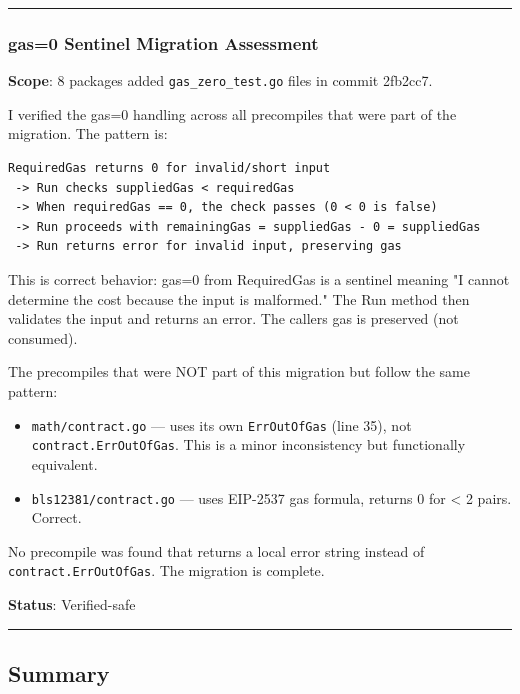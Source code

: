 \documentclass[
]{article}
\providecommand{\tightlist}{%
  \setlength{\itemsep}{0pt}\setlength{\parskip}{0pt}}
\begin{document}
\begin{center}\rule{0.5\linewidth}{0.5pt}\end{center}

\subsubsection{gas=0 Sentinel Migration
Assessment}\label{gas0-sentinel-migration-assessment}

\textbf{Scope}: 8 packages added \texttt{gas\_zero\_test.go} files in
commit 2fb2cc7.

I verified the gas=0 handling across all precompiles that were part of
the migration. The pattern is:

\begin{verbatim}
RequiredGas returns 0 for invalid/short input
 -> Run checks suppliedGas < requiredGas
 -> When requiredGas == 0, the check passes (0 < 0 is false)
 -> Run proceeds with remainingGas = suppliedGas - 0 = suppliedGas
 -> Run returns error for invalid input, preserving gas
\end{verbatim}

This is correct behavior: gas=0 from RequiredGas is a sentinel meaning
"I cannot determine the cost because the input is malformed." The Run
method then validates the input and returns an error. The
caller\textquotesingle s gas is preserved (not consumed).

The precompiles that were NOT part of this migration but follow the same
pattern:

\begin{itemize}
\tightlist
\item
  \texttt{math/contract.go} --- uses its own \texttt{ErrOutOfGas} (line
  35), not \texttt{contract.ErrOutOfGas}. This is a minor inconsistency
  but functionally equivalent.
\item
  \texttt{bls12381/contract.go} --- uses EIP-2537 gas formula, returns 0
  for \textless{} 2 pairs. Correct.
\end{itemize}

No precompile was found that returns a local error string instead of
\texttt{contract.ErrOutOfGas}. The migration is complete.

\textbf{Status}: Verified-safe

\begin{center}\rule{0.5\linewidth}{0.5pt}\end{center}

\subsection{Summary}\label{summary}
\end{document}
